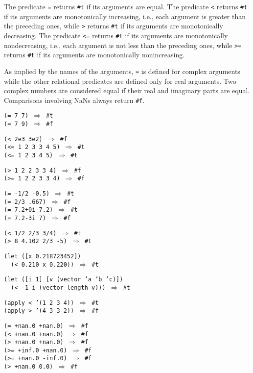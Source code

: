 The predicate \texttt{=} returns \texttt{\#{}t} if its arguments are equal.
The predicate \texttt{\textless{}} returns \texttt{\#{}t} if its arguments are monotonically
increasing, i.e., each argument is greater than the preceding ones,
while \texttt{\textgreater{}} returns \texttt{\#{}t} if its arguments are monotonically decreasing.
The predicate \texttt{\textless{}=} returns \texttt{\#{}t} if its arguments are monotonically
nondecreasing, i.e., each argument is not less than the preceding ones,
while \texttt{\textgreater{}=} returns \texttt{\#{}t} if its arguments are monotonically nonincreasing.


As implied by the names of the arguments, \texttt{=} is defined for complex
arguments while the other relational predicates are defined only for real
arguments.
Two complex numbers are considered equal if their real and imaginary parts
are equal.
Comparisons involving NaNs always return \texttt{\#{}f}.


\begin{alltt}
(= 7 7) \(\Rightarrow\) \#{}t
(= 7 9) \(\Rightarrow\) \#{}f

(\textless{} 2e3 3e2) \(\Rightarrow\) \#{}f
(\textless{}= 1 2 3 3 4 5) \(\Rightarrow\) \#{}t
(\textless{}= 1 2 3 4 5) \(\Rightarrow\) \#{}t

(\textgreater{} 1 2 2 3 3 4) \(\Rightarrow\) \#{}f
(\textgreater{}= 1 2 2 3 3 4) \(\Rightarrow\) \#{}f

(= -1/2 -0.5) \(\Rightarrow\) \#{}t
(= 2/3 .667) \(\Rightarrow\) \#{}f
(= 7.2+0i 7.2) \(\Rightarrow\) \#{}t
(= 7.2-3i 7) \(\Rightarrow\) \#{}f

(\textless{} 1/2 2/3 3/4) \(\Rightarrow\) \#{}t
(\textgreater{} 8 4.102 2/3 -5) \(\Rightarrow\) \#{}t

(let ([x 0.218723452])
  (\textless{} 0.210 x 0.220)) \(\Rightarrow\) \#{}t

(let ([i 1] [v (vector 'a 'b 'c)])
  (\textless{} -1 i (vector-length v))) \(\Rightarrow\) \#{}t

(apply \textless{} '(1 2 3 4)) \(\Rightarrow\) \#{}t
(apply \textgreater{} '(4 3 3 2)) \(\Rightarrow\) \#{}f

(= +nan.0 +nan.0) \(\Rightarrow\) \#{}f
(\textless{} +nan.0 +nan.0) \(\Rightarrow\) \#{}f
(\textgreater{} +nan.0 +nan.0) \(\Rightarrow\) \#{}f
(\textgreater{}= +inf.0 +nan.0) \(\Rightarrow\) \#{}f
(\textgreater{}= +nan.0 -inf.0) \(\Rightarrow\) \#{}f
(\textgreater{} +nan.0 0.0) \(\Rightarrow\) \#{}f
\end{alltt}

